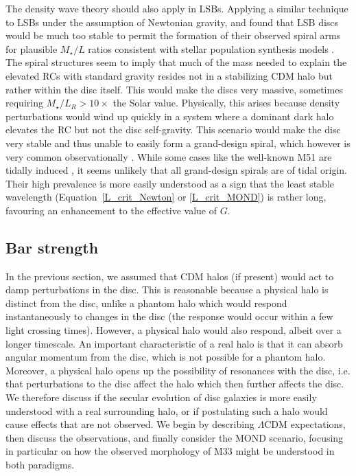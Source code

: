 \documentclass[fleqn,usenatbib,useAMS]{mnras} %
\begin{document}
The density wave theory should also apply in LSBs. Applying a similar technique to LSBs under the assumption of Newtonian gravity, \citet{Fuchs_2003} and \citet{Saburova_2013} found that LSB discs would be much too stable to permit the formation of their observed spiral arms for plausible $M_{\star}/L$ ratios consistent with stellar population synthesis models \citep[e.g.][]{Bell_2001}. The spiral structures seem to imply that much of the mass needed to explain the elevated RCs with standard gravity resides not in a stabilizing CDM halo but rather within the disc itself. This would make the discs very massive, sometimes requiring ${M_{\star}/L_R>10\times}$ the Solar value. Physically, this arises because density perturbations would wind up quickly in a system where a dominant dark halo elevates the RC but not the disc self-gravity. This scenario would make the disc very stable and thus unable to easily form a grand-design spiral, which however is very common observationally \citep{Hart_2017}. While some cases like the well-known M51 are tidally induced \citep{Dobbs_2010}, it seems unlikely that all grand-design spirals are of tidal origin. Their high prevalence is more easily understood as a sign that the least stable wavelength (Equation~\ref{L_crit_Newton} or \ref{L_crit_MOND}) is rather long, favouring an enhancement to the effective value of $G$.



\subsection{Bar strength}
\label{Bar_strength}

In the previous section, we assumed that CDM halos (if present) would act to damp perturbations in the disc. This is reasonable because a physical halo is distinct from the disc, unlike a phantom halo which would respond instantaneously to changes in the disc (the response would occur within a few light crossing times). However, a physical halo would also respond, albeit over a longer timescale. An important characteristic of a real halo is that it can absorb angular momentum from the disc, which is not possible for a phantom halo. Moreover, a physical halo opens up the possibility of resonances with the disc, i.e. that perturbations to the disc affect the halo which then further affects the disc. We therefore discuss if the secular evolution of disc galaxies is more easily understood with a real surrounding halo, or if postulating such a halo would cause effects that are not observed. We begin by describing $\Lambda$CDM expectations, then discuss the observations, and finally consider the MOND scenario, focusing in particular on how the observed morphology of M33 might be understood in both paradigms.
\end{document}
